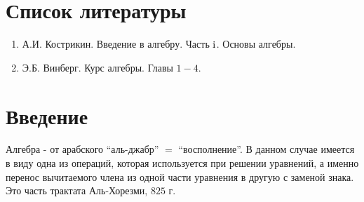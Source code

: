 \documentclass[12pt]{article}
\newcommand{\RN}[1]{%
	\textup{\uppercase\expandafter{\romannumeral#1}}%
}
\theoremstyle{definition}
\begin{document}
\lhead{Алгебра-\RN{1}}
\section*{Список литературы}
\begin{enumerate}[label=\arabic*)]
	\item А.И. Кострикин. Введение в алгебру. Часть $\RN{1}$. Основы алгебры.
	\item Э.Б. Винберг. Курс алгебры. Главы $1-4$.
\end{enumerate}

\section*{Введение}
Алгебра - от арабского ``аль-джабр'' $=$ ``восполнение''. В данном случае имеется в виду одна из операций, которая используется при решении уравнений, а именно перенос вычитаемого члена из одной части уравнения в другую с заменой знака. Это часть трактата Аль-Хорезми, $825$ г.
\end{document}
